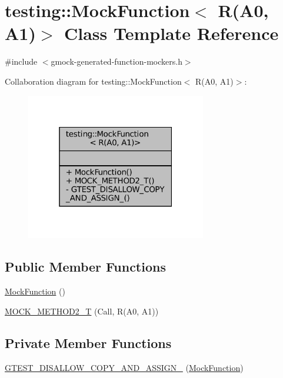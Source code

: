 \hypertarget{classtesting_1_1MockFunction_3_01R_07A0_00_01A1_08_4}{}\section{testing\+:\+:Mock\+Function$<$ R(A0, A1)$>$ Class Template Reference}
\label{classtesting_1_1MockFunction_3_01R_07A0_00_01A1_08_4}


{\ttfamily \#include $<$gmock-\/generated-\/function-\/mockers.\+h$>$}



Collaboration diagram for testing\+:\+:Mock\+Function$<$ R(A0, A1)$>$\+:
\nopagebreak
\begin{figure}[H]
\begin{center}
\leavevmode
\includegraphics[width=223pt]{classtesting_1_1MockFunction_3_01R_07A0_00_01A1_08_4__coll__graph}
\end{center}
\end{figure}
\subsection*{Public Member Functions}
\begin{DoxyCompactItemize}
\item 
\hyperlink{classtesting_1_1MockFunction_3_01R_07A0_00_01A1_08_4_a6a2575d43e9ec4f5d51cd53edbec7f82}{Mock\+Function} ()
\item 
\hyperlink{classtesting_1_1MockFunction_3_01R_07A0_00_01A1_08_4_a5a4d673a3252cab866f0a4fa97486190}{M\+O\+C\+K\+\_\+\+M\+E\+T\+H\+O\+D2\+\_\+T} (Call, R(A0, A1))
\end{DoxyCompactItemize}
\subsection*{Private Member Functions}
\begin{DoxyCompactItemize}
\item 
\hyperlink{classtesting_1_1MockFunction_3_01R_07A0_00_01A1_08_4_a4d66c78f85fd2c438bdf3ccdd61e6edb}{G\+T\+E\+S\+T\+\_\+\+D\+I\+S\+A\+L\+L\+O\+W\+\_\+\+C\+O\+P\+Y\+\_\+\+A\+N\+D\+\_\+\+A\+S\+S\+I\+G\+N\+\_\+} (\hyperlink{classtesting_1_1MockFunction}{Mock\+Function})
\end{DoxyCompactItemize}


